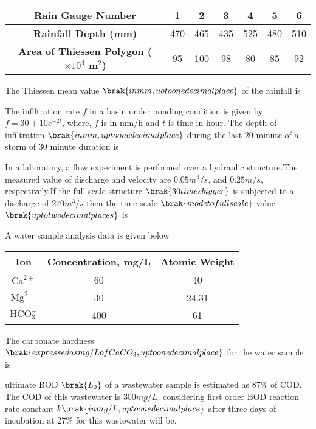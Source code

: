 \begin{table}[h!]
\centering
\begin{tabular}{|c|c|c|c|c|c|c|}
\hline
\textbf{Rain Gauge Number} & 1 & 2 & 3 & 4 & 5 & 6 \\
\hline
\textbf{Rainfall Depth (mm)} & 470 & 465 & 435 & 525 & 480 & 510 \\
\hline
\textbf{Area of Thiessen Polygon ($\times 10^4$ m$^2$)} & 95 & 100 & 98 & 80 & 85 & 92 \\
\hline
\end{tabular}
\end{table}
The Thiessen mean value $\brak{in mm, uo to one decimal place}$ of the rainfall is\\
\item The infiltration rate $f$ in a basin under ponding condition is given by $f=30+10e^{-2t}$,
where, $f$ is in mm/h and $t$ is time in hour. The depth of infiltration $\brak{in mm, up to one decimal place}$ during the last $20$ minute of a storm of $30$ minute duration is\\
\item In a laboratory, a flow experiment is performed over a hydraulic structure.The measured value of discharge and velocity are  $0.05 m^{3}/s$, and $0.25 m/s$, respectively.If the full scale structure $\brak{30 times bigger}$ is subjected to a discharge of $270 m^{3}/s$ then the time scale $\brak{mode to full scale}$ value $\brak{up to two decimal places}$ is\\
\item A water sample analysis data is given below\\
\begin{table}[h!]
    \centering
    \begin{tabular}{|c|c|c|}
        \hline
        \textbf{Ion} & \textbf{Concentration, mg/L} & \textbf{Atomic Weight} \\
        \hline
        $\text{Ca}^{2+}$ & 60 & 40 \\
        \hline
        $\text{Mg}^{2+}$ & 30 & 24.31 \\
        \hline
        $\text{HCO}_{3}^{-}$ & 400 & 61 \\
        \hline
    \end{tabular}
\end{table}
The carbonate hardness $\brak{expressed as mg/L of CaCO_{3}, up to one decimal place}$ for the water sample is\\
\item ultimate BOD $\brak{L_{0}}$ of a wastewater sample is estimated as $87\%$ of COD. The COD of this wastewater is $300 mg/L$. considering first order BOD reaction rate constant $k \brak{in mg/L, up to one decimal place}$ after three days of incubation at $27\%$ for this wastewater will be.







